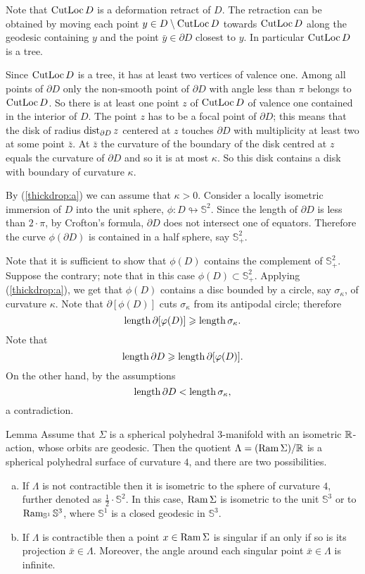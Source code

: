\documentclass[oneside,a4paper]{article}
\def\Ram{\mathop{\rm Ram}\nolimits}
\def\SS{\mathbb{S}}
\def\CutLoc{\mathop{\rm CutLoc}\nolimits}
\begin{document}
Note that $\CutLoc D$ is a
deformation retract of $D$.
The retraction can be obtained by moving each point $y\in D\setminus \CutLoc D$ towards $\CutLoc D$
along the geodesic containing $y$ and
the point $\bar y\in\partial D$ closest to $y$.
In particular $\CutLoc D$ is a tree.


Since $\CutLoc D$  is a tree, it has
at least two vertices of valence one.
Among all points of $\partial D$ only
the non-smooth point of $\partial D$ with angle less
than $\pi$ belongs to $\CutLoc D$.
So there is at least one point $z$
of $\CutLoc D$ of valence one
contained in the interior of $D$.
The point $z$ has to be a focal point of $\partial D$;
this means that
the disk of radius $\mathop{\rm dist}\nolimits_{\partial D}z$ centered at $z$ touches $\partial D$
with multiplicity at least two at some point $\bar z$.
At $\bar z$ the curvature of
the boundary of the disk centred at $z$ equals the curvature of
$\partial D$  and so it is at most $\kappa$. 
So this disk contains a disk with boundary of curvature $\kappa$.

By (\ref{thickdrop:a}) we can assume that $\kappa>0$.
Consider a locally isometric
immersion  of $D$ into the unit sphere, $\phi: D\looparrowright \SS^2$.
Since the length of $\partial D$ is less than
$2{\cdot}\pi$, by Crofton's formula,  $\partial D$
does not intersect one of equators.
Therefore the curve $\phi(\partial D)$ is contained in a half sphere, say $\SS^2_+$.

Note that
it is sufficient to show that $\phi(D)$ contains the complement of $\SS^2_+$.
Suppose the contrary; note that in this case $\phi(D)\subset \SS^2_+$.
Applying (\ref{thickdrop:a}),
we get that $\phi(D)$ contains a disc bounded by a circle,
say $\sigma_\kappa$, of curvature $\kappa$.
Note that $\partial[\phi(D)]$ cuts $\sigma_\kappa$ from its antipodal circle;
therefore
$$\mathop{\rm length}\nolimits \partial[\varphi(D)]\geqslant \mathop{\rm length}\nolimits \sigma_\kappa.$$
Note that
$$\mathop{\rm length}\nolimits\partial D\geqslant \mathop{\rm length}\nolimits \partial[\varphi(D)].$$
On the other hand, by the assumptions
$$\mathop{\rm length}\nolimits\partial D<\mathop{\rm length}\nolimits \sigma_\kappa,$$
a contradiction.
\qeds



\begin{thm}{Lemma}\label{twocases}
Assume that $\Sigma$ is a spherical polyhedral $3$-manifold
with an isometric $\mathbb{R}$-action, whose orbits are geodesic.
Then the quotient $\Lambda=(\Ram\Sigma)/\RR$ is a spherical polyhedral surface
of curvature $4$, and there are two possibilities.
\begin{enumerate}[(a)]
\item\label{twocases-a}
If $\Lambda$ is not contractible then it is isometric to the sphere of curvature $4$, further denoted as $\tfrac12\cdot\SS^2$.
In this case, $\Ram \Sigma$ is isometric to the unit $\SS^3$ or to $\Ram_{\SS^1}\SS^3$, where  $\SS^1$ is a closed geodesic in $\SS^3$.
\item\label{twocases-b} If $\Lambda$ is contractible
then a point $x\in \Ram \Sigma$ is singular
if an only if so is its projection $\bar x\in \Lambda$.
Moreover, the angle around each singular point $\bar x\in \Lambda$
is infinite.
\end{enumerate}
\end{thm}
\end{document}
